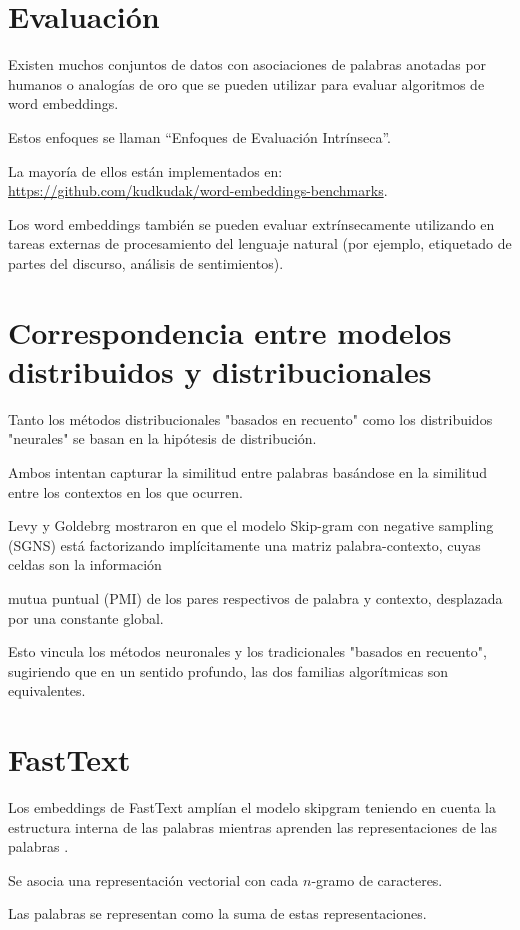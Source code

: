 \section{Evaluación}
Existen muchos conjuntos de datos con asociaciones de palabras anotadas por humanos o analogías de oro que se pueden utilizar para evaluar algoritmos de word embeddings.

Estos enfoques se llaman ``Enfoques de Evaluación Intrínseca''.

La mayoría de ellos están implementados en: \url{https://github.com/kudkudak/word-embeddings-benchmarks}.

Los word embeddings también se pueden evaluar extrínsecamente utilizando en tareas externas de procesamiento del lenguaje natural (por ejemplo, etiquetado de partes del discurso, análisis de sentimientos).

\section{Correspondencia entre modelos distribuidos y distribucionales}
Tanto los métodos distribucionales "basados en recuento" como los distribuidos "neurales" se basan en la hipótesis de distribución.

Ambos intentan capturar la similitud entre palabras basándose en la similitud entre los contextos en los que ocurren.

Levy y Goldebrg mostraron en \cite{levy2014neural} que el modelo Skip-gram con negative sampling (SGNS) está factorizando implícitamente una matriz palabra-contexto, cuyas celdas son la información

mutua puntual (PMI) de los pares respectivos de palabra y contexto, desplazada por una constante global.

Esto vincula los métodos neuronales y los tradicionales "basados en recuento", sugiriendo que en un sentido profundo, las dos familias algorítmicas son equivalentes.

\section{FastText}
Los embeddings de FastText amplían el modelo skipgram teniendo en cuenta la estructura interna de las palabras mientras aprenden las representaciones de las palabras \cite{bojanowski2016enriching}.

Se asocia una representación vectorial con cada $n$-gramo de caracteres.

Las palabras se representan como la suma de estas representaciones.

